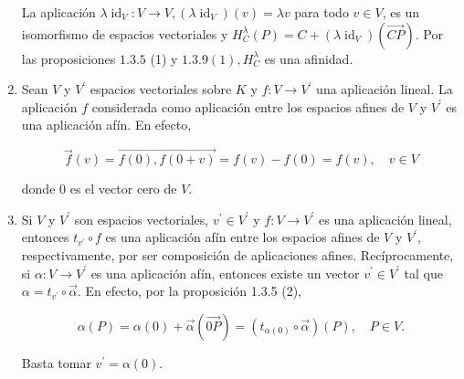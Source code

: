 \documentclass[12pt, a4paper, ones, notitlepage, openany,titlepage]{article}
\begin{document}
\begin{enumerate}
La aplicación $\lambda \operatorname{id}_{V}: V \rightarrow V,\left(\lambda \operatorname{id}_{V}\right)(v)=\lambda v$ para todo $v \in V$, es un isomorfismo de espacios vectoriales y $H_{C}^{\lambda}(P)=C+\left(\lambda \operatorname{id}_{V}\right)(\overrightarrow{C P})$. Por las proposiciones $1.3 .5$ (1) y $1.3 .9(1), H_{C}^{\lambda}$ es una afinidad.

\item Sean $V$ y $V^{\prime}$ espacios vectoriales sobre $K$ y $f: V \rightarrow V^{\prime}$ una aplicación lineal. La aplicación $f$ considerada como aplicación entre los espacios afines de $V$ y $V^{\prime}$ es una aplicación afín. En efecto,

$$
\overrightarrow{f}(v)=\overrightarrow{f(0), f(0+v)}=f(v)-f(0)=f(v), \quad v \in V
$$

donde 0 es el vector cero de $V$.

\item Si $V$ y $V^{\prime}$ son espacios vectoriales, $v^{\prime} \in V^{\prime}$ y $f: V \rightarrow V^{\prime}$ es una aplicación lineal, entonces $t_{v^{\prime}} \circ f$ es una aplicación afín entre los espacios afines de $V$ y $V^{\prime}$, respectivamente, por ser composición de aplicaciones afines. Recíprocamente, si $\alpha: V \rightarrow V^{\prime}$ es una aplicación afín, entonces existe un vector $v^{\prime} \in V^{\prime}$ tal que $\alpha=t_{v^{\prime}} \circ \overrightarrow{\alpha}$. En efecto, por la proposición 1.3.5 (2),

$$
\alpha(P)=\alpha(0)+\overrightarrow{\alpha}(\overrightarrow{0 P})=\left(t_{\alpha(0)} \circ \overrightarrow{\alpha}\right)(P), \quad P \in V .
$$

Basta tomar $v^{\prime}=\alpha(0)$.

\end{enumerate}
\end{document}

